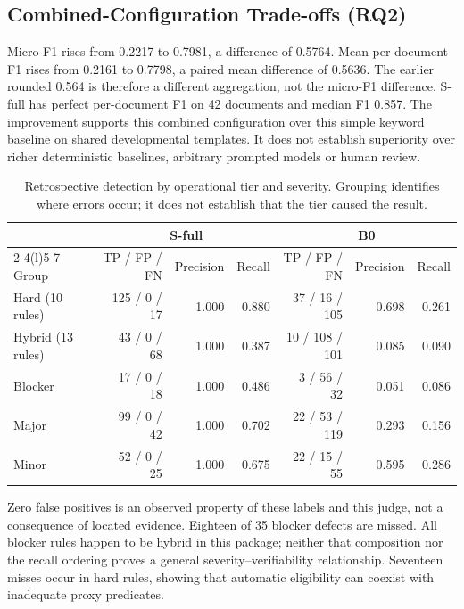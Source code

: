 \documentclass[computers,article,submit,moreauthors]{Definitions/mdpi}
\begin{document}
\subsection{Combined-Configuration Trade-offs (RQ2)}

Micro-F1 rises from 0.2217 to 0.7981, a difference of 0.5764. Mean per-document F1 rises from 0.2161 to 0.7798, a paired mean difference of 0.5636. The earlier rounded 0.564 is therefore a different aggregation, not the micro-F1 difference. S-full has perfect per-document F1 on 42 documents and median F1 0.857. The improvement supports this combined configuration over this simple keyword baseline on shared developmental templates. It does not establish superiority over richer deterministic baselines, arbitrary prompted models or human review.

\begin{table}[!ht]
\caption{Retrospective detection by operational tier and severity. Grouping identifies where errors occur; it does not establish that the tier caused the result.}
\label{tab:tiers-results}
\centering\footnotesize
\begin{tabular}{@{}lrrrrrr@{}}
\toprule
& \multicolumn{3}{c}{S-full} & \multicolumn{3}{c}{B0} \\
\cmidrule(lr){2-4}\cmidrule(l){5-7}
Group & TP / FP / FN & Precision & Recall & TP / FP / FN & Precision & Recall \\
\midrule
Hard (10 rules) & 125 / 0 / 17 & 1.000 & 0.880 & 37 / 16 / 105 & 0.698 & 0.261 \\
Hybrid (13 rules) & 43 / 0 / 68 & 1.000 & 0.387 & 10 / 108 / 101 & 0.085 & 0.090 \\
\midrule
Blocker & 17 / 0 / 18 & 1.000 & 0.486 & 3 / 56 / 32 & 0.051 & 0.086 \\
Major & 99 / 0 / 42 & 1.000 & 0.702 & 22 / 53 / 119 & 0.293 & 0.156 \\
Minor & 52 / 0 / 25 & 1.000 & 0.675 & 22 / 15 / 55 & 0.595 & 0.286 \\
\bottomrule
\end{tabular}
\end{table}

Zero false positives is an observed property of these labels and this judge, not a consequence of located evidence. Eighteen of 35 blocker defects are missed. All blocker rules happen to be hybrid in this package; neither that composition nor the recall ordering proves a general severity--verifiability relationship. Seventeen misses occur in hard rules, showing that automatic eligibility can coexist with inadequate proxy predicates.
\end{document}
